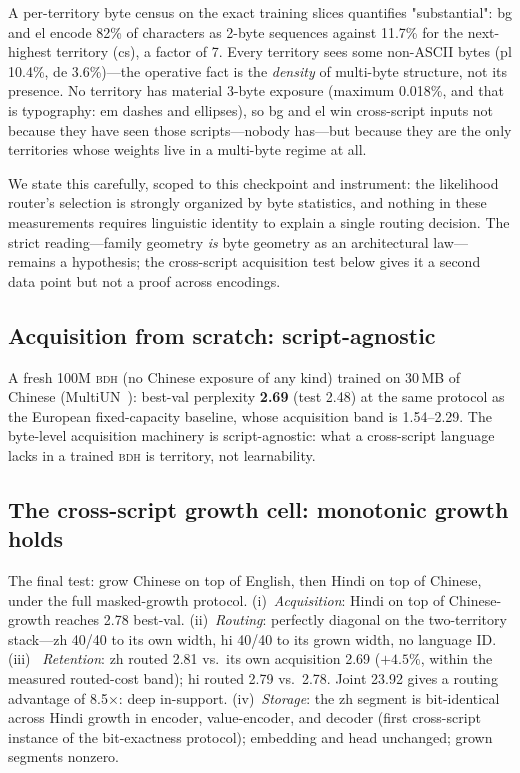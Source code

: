 \documentclass[11pt]{article}
\theoremstyle{definition}\newtheorem{definition}{Definition}
\theoremstyle{remark}\newtheorem{remark}{Remark}
\newcommand{\BDH}{\textsc{bdh}}
\begin{document}
A per-territory byte census on the exact training slices quantifies "substantial": bg and el encode 82\% of characters as 2-byte sequences against 11.7\% for the next-highest territory (cs), a factor of 7. Every territory sees some non-ASCII bytes (pl 10.4\%, de 3.6\%)---the operative fact is the \emph{density} of multi-byte structure, not its presence. No territory has material 3-byte exposure (maximum 0.018\%, and that is typography: em dashes and ellipses), so bg and el win cross-script inputs not because they have seen those scripts---nobody has---but because they are the only territories whose weights live in a multi-byte regime at all.

We state this carefully, scoped to this checkpoint and instrument: the likelihood
router's selection is strongly organized by byte statistics, and nothing in these
measurements requires linguistic identity to explain a single routing decision. The
strict reading---family geometry \emph{is} byte geometry as an architectural law---remains
a hypothesis; the cross-script acquisition test below gives it a second data point but not
a proof across encodings.

\subsection{Acquisition from scratch: script-agnostic}

A fresh 100M \BDH{} (no Chinese exposure of any kind) trained on 30\,MB of Chinese
(MultiUN~\cite{multiun}): best-val perplexity \textbf{2.69} (test 2.48) at the same protocol as the
European fixed-capacity baseline, whose acquisition band is 1.54--2.29. The byte-level
acquisition machinery is script-agnostic: what a cross-script language lacks in a trained
\BDH{} is territory, not learnability.

\subsection{The cross-script growth cell: monotonic growth holds}

The final test: grow Chinese on top of English, then Hindi on top of Chinese, under the
full masked-growth protocol. (i)~\emph{Acquisition}: Hindi on top of Chinese-growth
reaches 2.78 best-val. (ii)~\emph{Routing}: perfectly diagonal on the two-territory
stack---zh 40/40 to its own width, hi 40/40 to its grown width, no language ID. (iii)~
\emph{Retention}: zh routed 2.81 vs.\ its own acquisition 2.69 ($+4.5\%$, within the
measured routed-cost band); hi routed 2.79 vs.\ 2.78. Joint 23.92 gives a routing advantage of
8.5$\times$: deep in-support. (iv)~\emph{Storage}: the zh segment is bit-identical across
Hindi growth in encoder, value-encoder, and decoder (first cross-script instance of the
bit-exactness protocol); embedding and head unchanged; grown segments nonzero.
\end{document}
